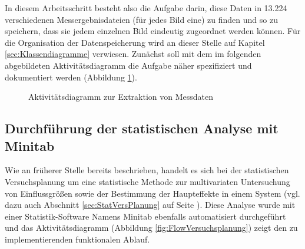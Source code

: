 \documentclass[
fontsize=10pt, 
listof = totoc,
parskip = half	
]{report}
\begin{document}
\noindent In diesem Arbeitsschritt besteht also die Aufgabe darin, diese Daten in 13.224 verschiedenen Messergebnisdateien (für jedes Bild eine) zu finden und so zu speichern, dass sie jedem einzelnen Bild eindeutig zugeordnet werden können. Für die Organisation der Datenspeicherung wird an dieser Stelle auf Kapitel \ref{sec:Klassendiagramme} verwiesen. Zunächst soll mit dem im folgenden abgebildeten Aktivitätsdiagramm die Aufgabe näher spezifiziert und dokumentiert werden (Abbildung \ref{fig:FlowDatenextraktion}).

\begin{figure}[H]
	\centering
	\caption{Aktivitätsdiagramm zur Extraktion von Messdaten}
	\label{fig:FlowDatenextraktion}
\end{figure}

\subsection{Durchführung der statistischen Analyse mit Minitab}
\label{subsec:FlowDoeMinitab}
Wie an früherer Stelle bereits beschrieben, handelt es sich bei der statistischen Versuchsplanung um eine statistische Methode zur multivariaten Untersuchung von Einflussgrößen sowie der Bestimmung der Haupteffekte in einem System (vgl. dazu auch Abschnitt \ref{sec:StatVersPlanung} auf Seite \pageref{sec:StatVersPlanung}). Diese Analyse wurde mit einer Statistik-Software Namens Minitab ebenfalls automatisiert durchgeführt und das Aktivitätsdiagramm (Abbildung \ref{fig:FlowVersuchsplanung}) zeigt den zu implementierenden funktionalen Ablauf.
\end{document}
